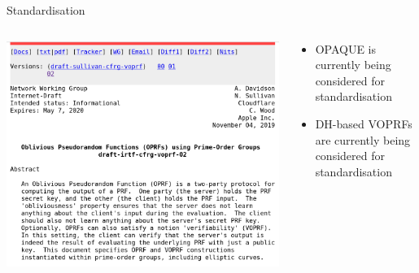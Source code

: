 \documentclass[xcolor=table,10pt,aspectratio=169]{beamer}
\begin{document}
\begin{frame}[label={sec:org861cc79}]{Standardisation}
\begin{columns}[t]
\begin{column}{0.6\columnwidth}
\begin{center}
\includegraphics[width=\linewidth]{./draft-sullivan-cfrg-vopr.png}
\end{center}
\end{column}

\begin{column}{0.4\columnwidth}
\begin{itemize}
\item OPAQUE is currently being considered for standardisation
\item \alert<2>{DH-based} VOPRFs are currently being considered for standardisation
\end{itemize}
\end{column}
\end{columns}
\end{frame}
\end{document}
